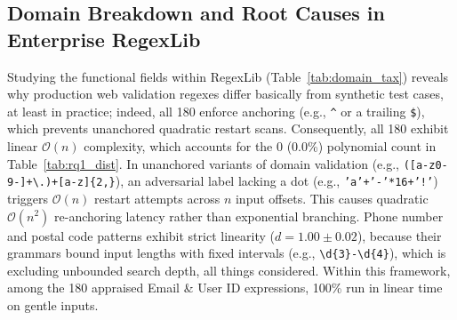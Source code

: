 \documentclass{ieeeaccess}
\begin{document}
\subsection{Domain Breakdown and Root Causes in Enterprise RegexLib}
Studying the functional fields within RegexLib (Table~\ref{tab:domain_tax}) reveals why production web validation regexes differ basically from synthetic test cases, at least in practice; indeed, all 180 enforce anchoring (e.g., \texttt{\^{}} or a trailing \texttt{\$}), which prevents unanchored quadratic restart scans. Consequently, all 180 exhibit linear $\mathcal{O}(n)$ complexity, which accounts for the 0 (0.0\%) polynomial count in Table~\ref{tab:rq1_dist}. In unanchored variants of domain validation (e.g., \texttt{([a-z0-9-]+\textbackslash .)+[a-z]\{2,\}}), an adversarial label lacking a dot (e.g., \texttt{'a'+'-'*16+'!'}) triggers $\mathcal{O}(n)$ restart attempts across $n$ input offsets. This causes quadratic $\mathcal{O}(n^2)$ re-anchoring latency rather than exponential branching. Phone number and postal code patterns exhibit strict linearity ($d = 1.00 \pm 0.02$), because their grammars bound input lengths with fixed intervals (e.g., \texttt{\textbackslash d\{3\}-\textbackslash d\{4\}}), which is excluding unbounded search depth, all things considered. Within this framework, among the 180 appraised Email \& User ID expressions, 100\% run in linear time on gentle inputs.
\end{document}
